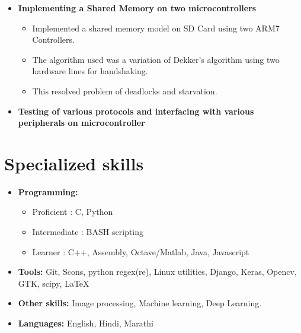\documentclass[11pt,a4paper,sans]{moderncv}        %
\begin{document}
\begin{itemize}
	
\item{\textbf{Implementing a Shared Memory on two microcontrollers}

\vspace{3pt}

		\small{
			\begin{itemize}
					\item Implemented a shared memory model on SD Card using two ARM7 Controllers.
					\item The algorithm used was a variation of Dekker's algorithm using two hardware lines for handshaking.
					\item This resolved problem of deadlocks and starvation.
			\end{itemize}
			}}

	\vspace{6pt}
	\item{\textbf{Testing of various protocols and interfacing with various peripherals on microcontroller}}

\end{itemize}

\section{Specialized skills}

\vspace{5pt}

\begin{itemize}

\item \textbf{Programming:} 
	\begin{itemize}
			\item Proficient : C, Python
			\item Intermediate : BASH scripting
			\item Learner : C++, Assembly, Octave/Matlab, Java, Javascript
	\end{itemize}

\vspace{3pt}

\item \textbf{Tools:} Git, Scons, python regex(re), Linux utilities, Django, Keras, Opencv, GTK, scipy, \LaTeX

\vspace{3pt}

\item \textbf{Other skills:}  Image processing, Machine learning, Deep Learning.

\vspace{3pt}

\item \textbf{Languages:} English, Hindi, Marathi

\end{itemize}
\end{document}
